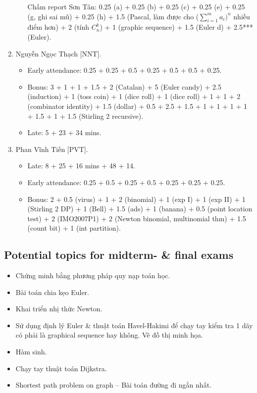 \documentclass{article}
\begin{document}
\begin{enumerate}
\begin{itemize}
		Chấm report Sơn Tân: 0.25 (a) + 0.25 (b) + 0.25 (c) + 0.25 (e) + 0.25 (g, ghi sai mũ) + 0.25 (h) + 1.5 (Pascal, làm được cho ($\sum_{i=1}^m a_i)^n$ nhiều điểm hơn) + 2 (tính $C_n^k$) + 1 (graphic sequence) + 1.5 (Euler d) + 2.5*** (Euler).
	\end{itemize}
	\item {\sc Nguyễn Ngọc Thạch [NNT].}
	\begin{itemize}
		\item Early attendance: 0.25 + 0.25 + 0.5 + 0.25 + 0.5 + 0.5 + 0.25.
		\item Bonus: 3 + 1 + 1 + 1.5 + 2 (Catalan) + 5 (Euler candy) + 2.5 (induction) + 1 (toss coin) + 1 (dice roll) + 1 (dice roll) + 1 + 1 + 2 (combinator identity) + 1.5 (dollar) + 0.5 + 2.5 + 1.5 + 1 + 1 + 1 + 1 + 1.5 + 1 + 1.5 (Stirling 2 recursive).
		\item Late: 5 + 23 + 34 mins.
	\end{itemize}
	\item {\sc Phan Vĩnh Tiến [PVT].}
	\begin{itemize}
		\item Late: 8 + 25 + 16 mins + 48 + 14.
		\item Early attendance: 0.25 + 0.5 + 0.25 + 0.5 + 0.25 + 0.25 + 0.25.
		\item Bonus: 2 + 0.5 (virus) + 1 + 2 (binomial) + 1 (exp I) + 1 (exp II) + 1 (Stirling 2 DP) + 1 (Bell) + 1.5 (ads) + 1 (banana) + 0.5 (point location test) + 2 (IMO2007P1) + 2 (Newton binomial, multinomial thm) + 1.5 (count bit) + 1 (int partition).
	\end{itemize}
\end{enumerate}


\subsection{Potential topics for midterm- \& final exams}

\begin{itemize}
	\item Chứng minh bằng phương pháp quy nạp toán học.
	\item Bài toán chia kẹo Euler.
	\item Khai triển nhị thức Newton.
	\item Sử dụng định lý Euler \& thuật toán Havel-Hakimi để chạy tay kiểm tra 1 dãy có phải là graphical sequence hay không. Vẽ đồ thị minh họa.
	\item Hàm sinh.
	\item Chạy tay thuật toán Dijkstra.
	\item Shortest path problem on graph -- Bài toán đường đi ngắn nhất.
\end{itemize}
\end{document}
